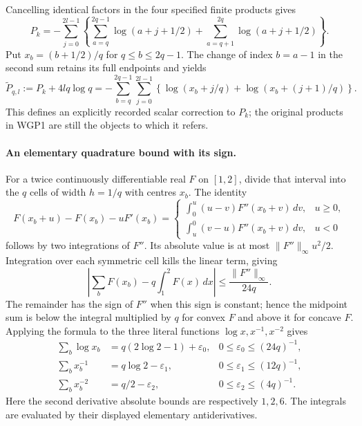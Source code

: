 \documentclass[11pt,a4paper]{article}
\begin{document}
Cancelling identical factors in the four specified finite products gives
\[
 P_k=-\sum_{j=0}^{2l-1}\left\{
 \sum_{a=q}^{2q-1}\log(a+j+1/2)
 +\sum_{a=q+1}^{2q}\log(a+j+1/2)\right\}.
 \tag{WGP2}
\]
Put $x_b=(b+1/2)/q$ for $q\le b\le2q-1$. The change of index
$b=a-1$ in the second sum retains its full endpoints and yields
\[
 \widetilde P_{q,l}:=P_k+4lq\log q
 =-\sum_{b=q}^{2q-1}\sum_{j=0}^{2l-1}
  \left\{\log(x_b+j/q)+\log(x_b+(j+1)/q)\right\}.
 \tag{WGP3}
\]
This defines an explicitly recorded scalar correction to $P_k$; the
original products in WGP1 are still the objects to which it refers.

\paragraph{An elementary quadrature bound with its sign.}
For a twice continuously differentiable real $F$ on $[1,2]$, divide
that interval into the $q$ cells of width $h=1/q$ with centres $x_b$.
The identity
\[
 F(x_b+u)-F(x_b)-uF'(x_b)
 =\begin{cases}
 \displaystyle\int_0^u(u-v)F''(x_b+v)\,dv,&u\ge0,\\
 \displaystyle\int_u^0(v-u)F''(x_b+v)\,dv,&u<0
 \end{cases}
\]
follows by two integrations of $F''$. Its absolute value is at most
$\|F''\|_\infty u^2/2$. Integration over each symmetric cell kills the
linear term, giving
\[
 \left|\sum_b F(x_b)-q\int_1^2F(x)\,dx\right|
 \le\frac{\|F''\|_\infty}{24q}.
 \tag{WGP4}
\]
The remainder has the sign of $F''$ when this sign is constant; hence
the midpoint sum is below the integral multiplied by $q$ for convex $F$
and above it for concave $F$. Applying the formula to the three literal
functions $\log x,x^{-1},x^{-2}$ gives
\[
 \begin{aligned}
 \sum_b\log x_b&=q(2\log2-1)+\varepsilon_0,
       &0\le\varepsilon_0\le(24q)^{-1},\\
 \sum_b x_b^{-1}&=q\log2-\varepsilon_1,
       &0\le\varepsilon_1\le(12q)^{-1},\\
 \sum_b x_b^{-2}&=q/2-\varepsilon_2,
       &0\le\varepsilon_2\le(4q)^{-1}.
 \end{aligned}\tag{WGP5}
\]
Here the second derivative absolute bounds are respectively $1,2,6$.
The integrals are evaluated by their displayed elementary antiderivatives.
\end{document}
